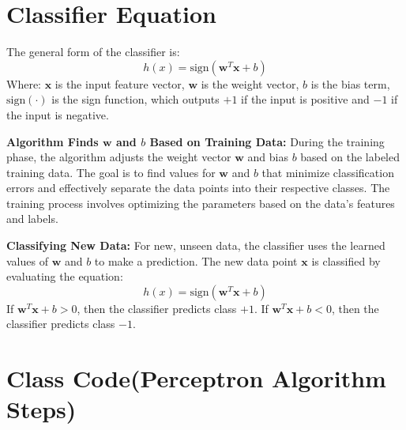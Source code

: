\section{Classifier Equation}


The general form of the classifier is:
\[
h(x) = \text{sign}(\mathbf{w}^T \mathbf{x} + b)
\]
Where:
\( \mathbf{x} \) is the input feature vector,
\( \mathbf{w} \) is the weight vector,
\( b \) is the bias term,
\( \text{sign}(\cdot) \) is the sign function, which outputs \( +1 \) if the input is positive and \( -1 \) if the input is negative.

\begin{outline}
    \1 \textbf{Algorithm Finds \( \mathbf{w} \) and \( b \) Based on Training Data:} 
    During the training phase, the algorithm adjusts the weight vector \( \mathbf{w} \) and bias \( b \) based on the labeled training data. 
    The goal is to find values for \( \mathbf{w} \) and \( b \) that minimize classification errors and effectively separate the data points into their respective classes. 
    The training process involves optimizing the parameters based on the data's features and labels.

    \1 \textbf{Classifying New Data:} 
    For new, unseen data, the classifier uses the learned values of \( \mathbf{w} \) and \( b \) to make a prediction. 
    The new data point \( \mathbf{x} \) is classified by evaluating the equation:
    \[
    h(x) = \text{sign}(\mathbf{w}^T \mathbf{x} + b)
    \]
        \2 If \( \mathbf{w}^T \mathbf{x} + b > 0 \), then the classifier predicts class \( +1 \).
        \2 If \( \mathbf{w}^T \mathbf{x} + b < 0 \), then the classifier predicts class \( -1 \).
\end{outline}

\section{Class Code(Perceptron Algorithm Steps)}

